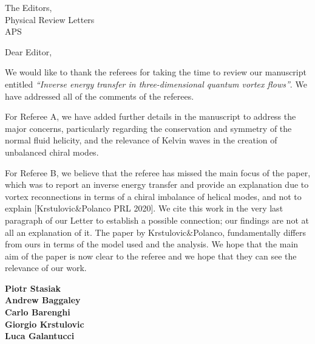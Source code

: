 \documentclass[a4paper,10pt]{letter}
\begin{document}


The Editors,\\
Physical Review Letters\\
APS\\


\vspace{1cm}

Dear Editor,

\vspace{0.5cm}

We would like to thank the referees for taking the time to review our manuscript entitled \emph{``Inverse energy transfer in three-dimensional quantum vortex flows''}. We have addressed all of the comments of the referees. 

For Referee A, we have added further details in the manuscript to address the major concerns, particularly regarding the conservation and symmetry of the normal fluid helicity, and the relevance of Kelvin waves in the creation of unbalanced chiral modes. 

For Referee B, we believe that the referee has missed the main focus of the paper, which was to report an inverse energy transfer and provide an explanation due to vortex reconnections in terms of a chiral imbalance of helical modes, and not to explain [Krstulovic\&Polanco PRL 2020]. We cite this work in the very last paragraph of our Letter to establish a possible connection; our findings are not at all an explanation of it. The paper by Krstulovic\&Polanco, fundamentally differs from ours in terms of the model used and the analysis. We hope that the main aim of the paper is now clear to the referee and we hope that they can see the relevance of our work.

\vspace{1cm}

\textbf{Piotr Stasiak}\\
\textbf{Andrew Baggaley}\\
\textbf{Carlo Barenghi}\\
\textbf{Giorgio Krstulovic}\\
\textbf{Luca Galantucci}\\
\end{document}
